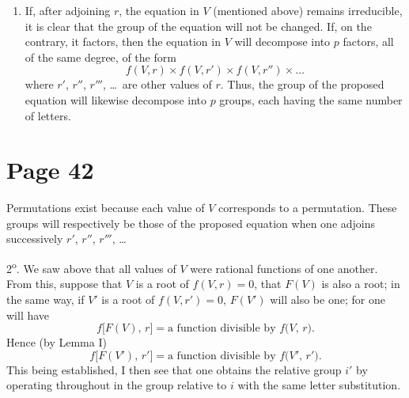 \documentclass{article}
\begin{document}
\begin{enumerate}
\item If, after adjoining $r$, the equation in $V$ (mentioned above) remains irreducible, it is clear that the group of the equation will not be changed. If, on the contrary, it factors, then the equation in $V$ will decompose into $p$ factors, all of the same degree, of the form
\[
f(V,r) \times f(V,r') \times f(V,r'') \times \dots
\]
where $r'$, $r''$, $r'''$, \dots\ are other values of $r$. Thus, the group of the proposed equation will likewise decompose into $p$ groups, each having the same number of letters.
\end{enumerate}


\section*{Page 42}

Permutations exist because each value of $V$ corresponds to a permutation. These groups will respectively be those of the proposed equation when one adjoins successively $r'$, $r''$, $r'''$, \dots

2\textsuperscript{o}. We saw above that all values of $V$ were rational functions of one another. From this, suppose that $V$ is a root of $f(V,r)=0$, that $F(V)$ is also a root; in the same way, if $V'$ is a root of $f(V,r')=0$, $F(V')$ will also be one; for one will have
\[
f\bigl[F(V),\,r\bigr] = \text{a function divisible by } f\bigl(V,\,r\bigr).
\]
Hence (by Lemma I)
\[
f\bigl[F(V'),\,r'\bigr] = \text{a function divisible by } f\bigl(V',\,r'\bigr).
\]
This being established, I then see that one obtains the relative group $i'$ by operating throughout in the group relative to $i$ with the same letter substitution.
\end{document}
